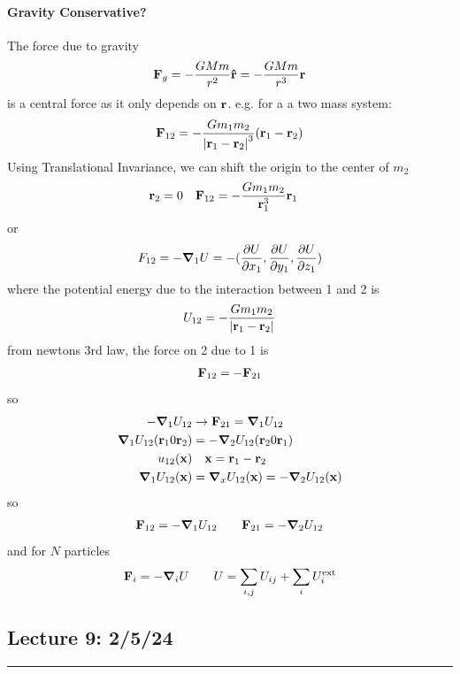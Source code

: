 \documentclass[../main.tex]{subfiles}
\begin{document}
\paragraph{Gravity Conservative?} The force due to gravity
\begin{align*}
    \vb{F}_g = -\frac{G M m}{r^2} \vu{r} = -\frac{G M m}{r^3} \vb{r}
\end{align*}
is a central force as it only depends on $\vb{r}$. e.g. for a a two mass system:
\begin{align*}
    \vb{F}_{12} = - \frac{G m_1 m_2}{\abs{\vb{r}_1 - \vb{r}_2}^3} (\vb{r}_1 - \vb{r}_2)
\end{align*}
Using Translational Invariance, we can shift the origin to the center of $m_2$
\begin{align*}
    \vb{r}_2 &= 0 \quad \vb{F}_{12} = - \frac{G m_1 m_2}{\vb{r}_1^3} \vb{r}_1
\end{align*}
or
\begin{align*}
    F_{12} = - \grad_1 U = - (\pdv{U}{x_1}, \pdv{U}{y_1}, \pdv{U}{z_1})
\end{align*}
where the potential energy due to the interaction between 1 and 2 is
\begin{align*}
    U_{12} = - \frac{G m_1 m_2}{\abs{\vb{r}_1 - \vb{r}_2}}
\end{align*}
from newtons 3rd law, the force on 2 due to 1 is
\begin{align*}
    \vb{F}_{12} = - \vb{F}_{21}
\end{align*}
so
\begin{align*}
    -\grad_1 U_{12} &\to \vb{F}_{21} = \grad_1 U_{12} \\
    \grad_1 U_{12} (\vb{r}_1 0 \vb{r}_2) &= - \grad_2 U_{12} (\vb{r}_2 0 \vb{r}_1) \\
    u_{12}(\vb{x}) &\quad \vb{x} = \vb{r}_1 - \vb{r}_2 \\
    \grad_1 U_{12}(\vb{x}) &= \grad_x U_{12}(\vb{x}) = - \grad_2 U_{12}(\vb{x})
\end{align*}
so
\begin{align*}
    \vb{F}_{12} = - \grad_1 U_{12} \qquad \vb{F}_{21} = - \grad_2 U_{12}
\end{align*}
and for $N$ particles
\begin{align*}
    \vb{F}_i = - \grad_i U \qquad U = \sum_{i,j} U_{ij} + \sum_i U_i^{\text{ext}}
\end{align*}

\newpage
\subsection*{Lecture 9: \hfill  2/5/24}
\hrule \vspace{10px}
\end{document}
